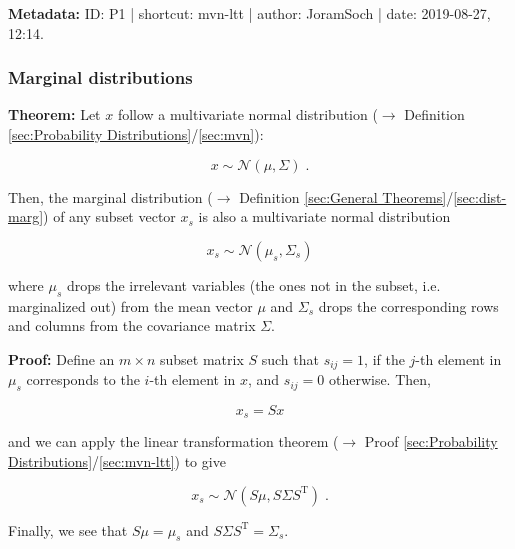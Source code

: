 \documentclass[a4paper,12pt,twoside]{book}
\begin{document}
\vspace{1em}
\textbf{Metadata:} ID: P1 | shortcut: mvn-ltt | author: JoramSoch | date: 2019-08-27, 12:14.
\vspace{1em}



\subsubsection[\textbf{Marginal distributions}]{Marginal distributions} \label{sec:mvn-marg}
\setcounter{equation}{0}

\textbf{Theorem:} Let $x$ follow a multivariate normal distribution ($\rightarrow$ Definition \ref{sec:Probability Distributions}/\ref{sec:mvn}):

\begin{equation} \label{eq:mvn-marg-mvn}
x \sim \mathcal{N}(\mu, \Sigma) \; .
\end{equation}

Then, the marginal distribution ($\rightarrow$ Definition \ref{sec:General Theorems}/\ref{sec:dist-marg}) of any subset vector $x_s$ is also a multivariate normal distribution

\begin{equation} \label{eq:mvn-marg-mvn-marg}
x_s \sim \mathcal{N}(\mu_s, \Sigma_s)
\end{equation}

where $\mu_s$ drops the irrelevant variables (the ones not in the subset, i.e. marginalized out) from the mean vector $\mu$ and $\Sigma_s$ drops the corresponding rows and columns from the covariance matrix $\Sigma$.


\vspace{1em}
\textbf{Proof:} Define an $m \times n$ subset matrix $S$ such that $s_{ij} = 1$, if the $j$-th element in $\mu_s$ corresponds to the $i$-th element in $x$, and $s_{ij} = 0$ otherwise. Then,

\begin{equation} \label{eq:mvn-marg-xs}
x_s = S x
\end{equation}

and we can apply the linear transformation theorem ($\rightarrow$ Proof \ref{sec:Probability Distributions}/\ref{sec:mvn-ltt}) to give

\begin{equation} \label{eq:mvn-marg-mvn-marg-qed}
x_s \sim \mathcal{N}(S \mu, S \Sigma S^\mathrm{T}) \; .
\end{equation}

Finally, we see that $S \mu = \mu_s$ and $S \Sigma S^\mathrm{T} = \Sigma_s$.
\end{document}
